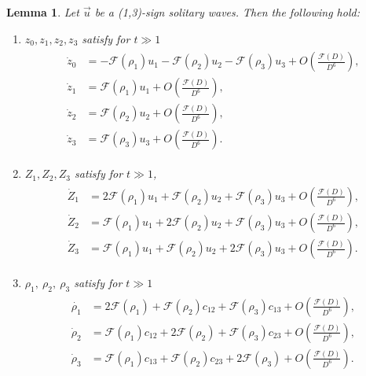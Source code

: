 \documentclass[reqno]{amsart}
\theoremstyle{plain}
\newtheorem{lemma}[theorem]{Lemma}
\theoremstyle{definition}
\numberwithin{equation}{section}
\newcommand{\1}{\mathbbm{1}}
\begin{document}
\begin{lemma}\label{daijisiki2}
Let $\vec{u}$ be a (1,3)-sign solitary waves. Then the following hold:
\begin{enumerate}
\item  $z_0,z_1,z_2,z_3$ satisfy for $t\gg 1$
\begin{align}\label{(1,3)zdynamicsver2}
\begin{aligned}
\dot{z}_0&=-\mathcal{F}(\rho_1)u_1-\mathcal{F}(\rho_2)u_2-\mathcal{F}(\rho_3)u_3+O\left(\frac{\mathcal{F}(D)}{D^6}\right),
\\
\dot{z}_1&=\mathcal{F}(\rho_1)u_1+O\left(\frac{\mathcal{F}(D)}{D^6}\right),
\\
\dot{z}_2&=\mathcal{F}(\rho_2)u_2+O\left(\frac{\mathcal{F}(D)}{D^6}\right),
\\
\dot{z}_3&=\mathcal{F}(\rho_3)u_3+O\left(\frac{\mathcal{F}(D)}{D^6}\right).
\end{aligned}
\end{align}


\item $Z_1,Z_2,Z_3$ satisfy for $t\gg 1$,
\begin{align}\label{Zesver2}
\begin{aligned}
\dot{Z}_1&=2\mathcal{F}(\rho_1)u_1+\mathcal{F}(\rho_2)u_2+\mathcal{F}(\rho_3)u_3+O\left(\frac{\mathcal{F}(D)}{D^6}\right),
\\
\dot{Z}_2&=\mathcal{F}(\rho_1)u_1+2\mathcal{F}(\rho_2)u_2+\mathcal{F}(\rho_3)u_3+O\left(\frac{\mathcal{F}(D)}{D^6}\right),
\\
\dot{Z}_3&=\mathcal{F}(\rho_1)u_1+\mathcal{F}(\rho_2)u_2+2\mathcal{F}(\rho_3)u_3+O\left(\frac{\mathcal{F}(D)}{D^6}\right).
\end{aligned}
\end{align}

\item $\rho_1,\ \rho_2,\ \rho_3$ satisfy for $t\gg 1$
\begin{align}\label{rhoesver2}
\begin{aligned}
\dot{\rho_1}&=2\mathcal{F}(\rho_1)+\mathcal{F}(\rho_2)c_{12}+\mathcal{F}(\rho_3)c_{13}+O\left(\frac{\mathcal{F}(D)}{D^6}\right),
\\
\dot{\rho}_2&=\mathcal{F}(\rho_1)c_{12}+2\mathcal{F}(\rho_2)+\mathcal{F}(\rho_3)c_{23}+O\left(\frac{\mathcal{F}(D)}{D^6}\right),
\\
\dot{\rho}_3&=\mathcal{F}(\rho_{1})c_{13}+\mathcal{F}(\rho_2)c_{23}+2\mathcal{F}(\rho_3)+O\left(\frac{\mathcal{F}(D)}{D^6}\right).
\end{aligned}
\end{align}


\end{enumerate}
\end{lemma}
\end{document}
